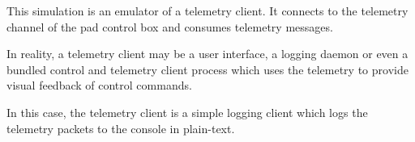 This simulation is an emulator of a telemetry client. It connects to the telemetry channel of the pad control box and consumes telemetry messages.

In reality, a telemetry client may be a user interface, a logging daemon or even a bundled control and telemetry client process which uses the telemetry to provide visual feedback of control commands.

In this case, the telemetry client is a simple logging client which logs the telemetry packets to the console in plain-\/text. 